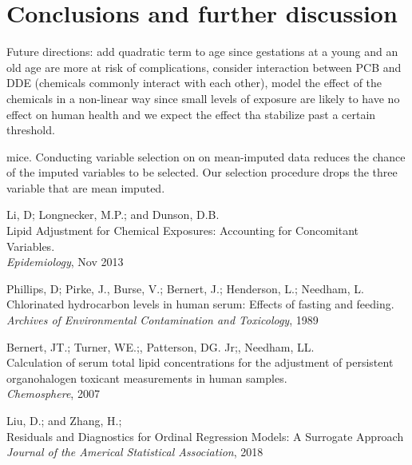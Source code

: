 \documentclass[10pt]{jmlr}%
\begin{document}
\section{Conclusions and further discussion}
\label{sec:conclusion}

Future directions: add quadratic term to age since gestations at a young and an old age are more at risk of complications, consider interaction between PCB and DDE (chemicals commonly interact with each other), model the effect of the chemicals in a non-linear way since small levels of exposure are likely to have no effect on human health and we expect the effect tha stabilize past a certain threshold.

mice. Conducting variable selection on on mean-imputed data reduces the chance of the imputed variables to be selected. Our selection procedure drops the three variable that are mean imputed.


\newpage %
\begin{thebibliography}{99} %
	
	 Li, D; Longnecker, M.P.; and Dunson, D.B. \\
	\newblock Lipid Adjustment for Chemical Exposures: Accounting for Concomitant Variables.\\
	\newblock \emph{Epidemiology}, Nov 2013
	
	Phillips, D; Pirke, J., Burse, V.; Bernert, J.; Henderson, L.; Needham, L.\\
	\newblock Chlorinated hydrocarbon levels in human serum: Effects of fasting and feeding.\\
	\newblock \emph{Archives of Environmental Contamination and Toxicology}, 1989
	
	 Bernert, JT.; Turner, WE.;, Patterson, DG. Jr;, Needham, LL.\\
	\newblock Calculation of serum total lipid concentrations for the adjustment of persistent organohalogen toxicant measurements in human samples.\\
	\newblock \emph{Chemosphere}, 2007
	
	 Liu, D.; and Zhang, H.;\\
	\newblock Residuals and Diagnostics for Ordinal Regression Models: A Surrogate Approach\\
	\newblock \emph{Journal of the Americal Statistical Association}, 2018
	
\end{thebibliography}
\end{document}
